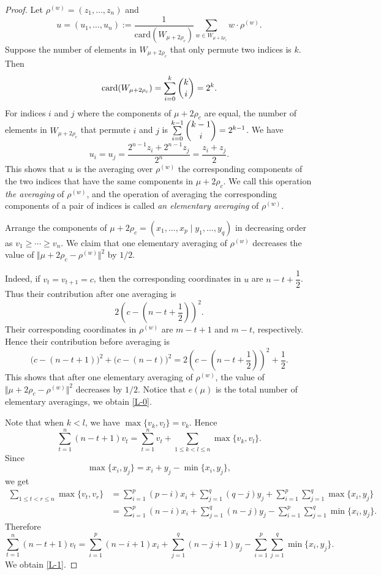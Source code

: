 \documentclass[11pt]{amsart}
\theoremstyle{plain}
\theoremstyle{definition}
\begin{document}
 \begin{proof}
 	Let $\rho^{(w)}=(z_1,\dots,z_n)$ and
 	\[
 	u=(u_1,\dots,u_n):=\dfrac{1}{\mathrm{card}(W_{\mu+2\rho_c})}\sum_{w\in W_{\mu+2\rho_c}}w\cdot \rho^{(w)}.
 	\]
 	Suppose the number of elements in $W_{\mu+2\rho_c}$ that only permute two indices is $k$. Then
 	\[
 	\mathrm{card}(W_{\mu+2\rho_c})=\sum_{i=0}^k \dbinom{k}{i}=2^k.
 	\]
 	For indices $i$ and $j$ where the components of $\mu+2\rho_c$ are equal, the number of elements in $W_{\mu+2\rho_c}$ that permute $i$ and $j$ is $\sum\limits_{i=0}^{k-1}\dbinom{k-1}{i}=2^{k-1}$. We have
 	\[
 	u_i=u_j=\dfrac{2^{n-1}z_i+2^{n-1}z_j}{2^n}=\dfrac{z_i+z_j}{2}.
 	\]
 	This shows that $u$ is the averaging over $\rho^{(w)}$ the corresponding components of the two indices that have the same components in $\mu+2\rho_c$. We call this operation \emph{the averaging} of $\rho^{(w)}$, and the operation of averaging the corresponding components of a pair of indices is called \emph{an elementary averaging} of $\rho^{(w)}$.
 	
 	Arrange the components of $\mu+2\rho_c=(x_1,\dots,x_p\mid y_1,\dots,y_q)$ in decreasing order as $v_1\ge\cdots\ge v_n$. We claim that one elementary averaging of $\rho^{(w)}$ decreases the value of $\Vert\mu+2\rho_c-\rho^{(w)}\Vert^2$ by $1/2$.
 	
 	Indeed, if $v_t=v_{t+1}=c$, then the corresponding coordinates in $u$ are $n-t+\dfrac{1}{2}$. Thus their contribution after one averaging is
 	\[
 	2\left(c-(n-t+\dfrac{1}{2})\right)^2.
 	\]
 	Their corresponding coordinates in $\rho^{(w)}$ are $m-t+1$ and $m-t$, respectively. Hence their contribution before averaging is
 	\[
 	\big(c-(n-t+1)\big)^2+\big(c-(n-t)\big)^2=2\left(c-(n-t+\dfrac{1}{2})\right)^2+\dfrac{1}{2}.
 	\]
 	This shows that after one elementary averaging of $\rho^{(w)}$, the value of $\Vert\mu+2\rho_c-\rho^{(w)}\Vert^2$ decreases by $1/2$. Notice that $e(\mu)$ is the total number of elementary averagings, we obtain \eqref{L-0}.
 	
 	Note that when $k<l$, we have $\max\{v_k,v_l\}=v_k$. Hence
 	\[
 	\sum_{t=1}^n(n-t+1)v_t=\sum_{t=1}^n v_t+\sum_{1\le k<l\le n}\max\{v_k,v_l\}.
 	\]
 	Since
 	\[
 	\max\{x_i,y_j\}=x_i+y_j-\min\{x_i,y_j\},
 	\]
 	we get
 	\begin{align*}
 		\sum_{1\le t<r\le n}\max\{v_t,v_r\}
 		&=\sum_{i=1}^p(p-i)x_i+\sum_{j=1}^q(q-j)y_j+\sum_{i=1}^p\sum_{j=1}^q\max\{x_i,y_j\}\\
 		&=\sum_{i=1}^p(n-i)x_i+\sum_{j=1}^q(n-j)y_j-\sum_{i=1}^p\sum_{j=1}^q\min\{x_i,y_j\}.
 	\end{align*}
 	Therefore
 	\[
 	\sum_{t=1}^n(n-t+1)v_t=\sum_{i=1}^p(n-i+1)x_i+\sum_{j=1}^q(n-j+1)y_j-\sum_{i=1}^p\sum_{j=1}^q\min\{x_i,y_j\}.
 	\]
 	We obtain \eqref{L-1}.
 \end{proof}
\end{document}
